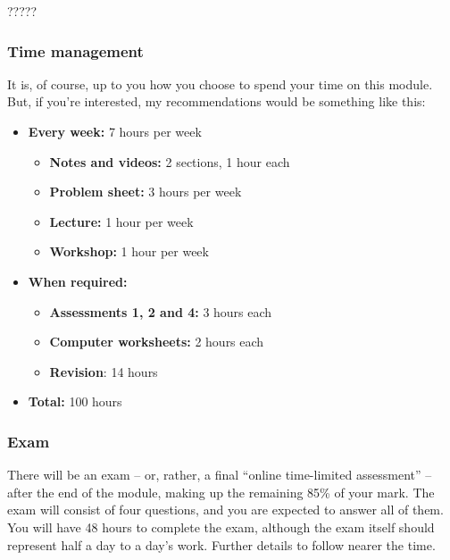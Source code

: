 \documentclass[
  a4paper,
]{article}
\providecommand{\tightlist}{%
  \setlength{\itemsep}{0pt}\setlength{\parskip}{0pt}}
\theoremstyle{definition}
\theoremstyle{definition}
\theoremstyle{definition}
\theoremstyle{remark}
\begin{document}
?????

\hypertarget{time}{%
\subsubsection*{Time management}\label{time}}

It is, of course, up to you how you choose to spend your time on this module. But, if you're interested, my recommendations would be something like this:

\begin{itemize}
\tightlist
\item
  \textbf{Every week:} 7 hours per week

  \begin{itemize}
  \tightlist
  \item
    \textbf{Notes and videos:} 2 sections, 1 hour each
  \item
    \textbf{Problem sheet:} 3 hours per week
  \item
    \textbf{Lecture:} 1 hour per week
  \item
    \textbf{Workshop:} 1 hour per week
  \end{itemize}
\item
  \textbf{When required:}

  \begin{itemize}
  \tightlist
  \item
    \textbf{Assessments 1, 2 and 4:} 3 hours each
  \item
    \textbf{Computer worksheets:} 2 hours each
  \item
    \textbf{Revision}: 14 hours
  \end{itemize}
\item
  \textbf{Total:} 100 hours
\end{itemize}

\hypertarget{exam}{%
\subsubsection*{Exam}\label{exam}}

There will be an exam -- or, rather, a final ``online time-limited assessment'' -- after the end of the module, making up the remaining 85\% of your mark. The exam will consist of four questions, and you are expected to answer all of them. You will have 48 hours to complete the exam, although the exam itself should represent half a day to a day's work. Further details to follow nearer the time.
\end{document}
